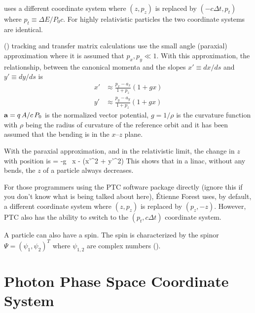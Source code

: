 \mad uses a different coordinate system where $(z, p_z)$ is
replaced by $(-c\Delta t, p_t)$ where $p_t \equiv \Delta E / P_0
c$. For highly relativistic particles the two coordinate systems are
identical.

 () tracking and transfer matrix
calculations use the small angle (paraxial) approximation where it is
assumed that $p_x, p_y \ll 1$. With this approximation, the
relationship, between the canonical momenta and the slopes $x' \equiv
dx/ds$ and $y' \equiv dy/ds$ is
\begin{align}
  x' &\approx \frac{p_x - a_x}{1 + p_z} (1 + g x) \\
  y' &\approx \frac{p_y - a_y}{1 + p_z} (1 + g x) 
  \label{xpa1p}
\end{align}
${\bf a} = q \, A / c \, P_0$ is the normalized vector potential, $g =
1/\rho$ is the curvature function with $\rho$ being the radius of
curvature of the reference orbit and it has been assumed that the
bending is in the $x$--$z$ plane. 

With the paraxial approximation, and in the relativistic limit, the
change in $z$ with position is
\Begineq
   = -g \, x -  (x'^2 + y'^2)
\Endeq
This shows that in a linac, without any bends, the $z$ of a particle
always decreases.

For those programmers using the PTC
software package directly (ignore
this if you don't know what is being talked about here), \'Etienne Forest uses,
by default, a different coordinate system where $(z, p_z)$ is replaced
by $(p_z, -z)$. However, PTC also has the ability to switch to the
$(p_t, c \Delta t)$ coordinate system.

A particle can also have a spin. The spin is characterized by the
spinor $\Psi = \left( \psi_{1}, \psi_{2} \right)^{T}$ where
$\psi_{1,2}$ are complex numbers ().

\section{Photon Phase Space Coordinate System}
\label{s:photon.phase.space}

